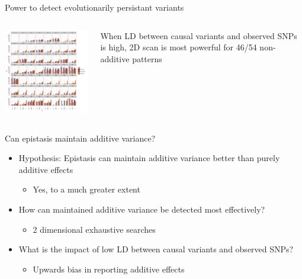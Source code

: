 \documentclass{beamer}
\begin{document}
\begin{frame}{Power to detect evolutionarily persistant variants}

\begin{columns}[c]


\includegraphics[width=8cm]{sup_heritbars_sim.png}


When LD between causal variants and observed SNPs is high, 2D scan is most powerful for 46/54 non-additive patterns

\end{columns}
\end{frame}



\begin{frame}{Can epistasis maintain additive variance?}
\begin{itemize}
\item Hypothesis: Epistasis can maintain additive variance better than purely additive effects
\begin{itemize}
\item Yes, to a much greater extent
\end{itemize}
\item How can maintained additive variance be detected most effectively?
\begin{itemize}
\item 2 dimensional exhaustive searches
\end{itemize}
\item What is the impact of low LD between causal variants and observed SNPs?
\begin{itemize}
\item Upwards bias in reporting additive effects
\end{itemize}
\end{itemize}
\end{frame}
\end{document}
